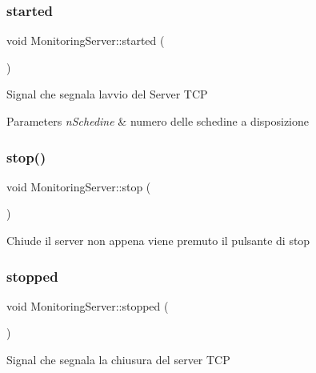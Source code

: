 \subsubsection{\texorpdfstring{started}{started}}
{\footnotesize\ttfamily void Monitoring\+Server\+::started (\begin{DoxyParamCaption}{ }\end{DoxyParamCaption})\hspace{0.3cm}{\ttfamily [signal]}}

Signal che segnala l\textquotesingle{}avvio del Server T\+CP 
\begin{DoxyParams}{Parameters}
{\em n\+Schedine} & numero delle schedine a disposizione \\
\hline
\end{DoxyParams}
\mbox{\label{class_monitoring_server_aa07082c64076b67ba802bfc2adec235b}} 
\subsubsection{\texorpdfstring{stop()}{stop()}}
{\footnotesize\ttfamily void Monitoring\+Server\+::stop (\begin{DoxyParamCaption}{ }\end{DoxyParamCaption})}

Chiude il server non appena viene premuto il pulsante di stop \mbox{\label{class_monitoring_server_a5884af90abe908f8dc09cb540d738559}} 
\subsubsection{\texorpdfstring{stopped}{stopped}}
{\footnotesize\ttfamily void Monitoring\+Server\+::stopped (\begin{DoxyParamCaption}{ }\end{DoxyParamCaption})\hspace{0.3cm}{\ttfamily [signal]}}

Signal che segnala la chiusura del server T\+CP \mbox{\label{class_monitoring_server_a184b7dece607f724cfa5cc05add554ce}} 
